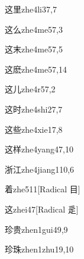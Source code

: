 \begin{entry}{这里}{zhe4li3}{7,7}
\end{entry}

\begin{entry}{这么}{zhe4me5}{7,3}
\end{entry}

\begin{entry}{这末}{zhe4me5}{7,5}
\end{entry}

\begin{entry}{这麽}{zhe4me5}{7,14}
\end{entry}

\begin{entry}{这儿}{zhe4r5}{7,2}
\end{entry}

\begin{entry}{这时}{zhe4shi2}{7,7}
\end{entry}

\begin{entry}{这些}{zhe4xie1}{7,8}
\end{entry}

\begin{entry}{这样}{zhe4yang4}{7,10}
\end{entry}

\begin{entry}{浙江}{zhe4jiang1}{10,6}
\end{entry}

\begin{entry}{着}{zhe5}{11}[Radical 目]
\end{entry}

\begin{entry}{这}{zhei4}{7}[Radical 辵]
\end{entry}

\begin{entry}{珍贵}{zhen1gui4}{9,9}
\end{entry}

\begin{entry}{珍珠}{zhen1zhu1}{9,10}
\end{entry}

